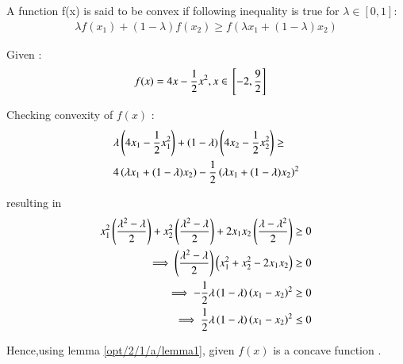 \begin{lemma}
A function f(x) is said to be convex if following inequality is true for $\lambda \in [0,1] :$  \label{opt/2/1/a/lemma1}
\begin{align}
    \lambda f(x_1) + (1-\lambda)f(x_2) \geq f(\lambda x_1 + (1-\lambda)x_2)
\end{align}
\end{lemma}

Given :
\begin{align}
    f(x) &= 4x-\frac{1}{2}x^2 , x \in {}\left[-2,\frac{9}{2}\right]
\end{align}

Checking convexity of $f(x)$ :
\begin{equation}
\begin{aligned}
    &\lambda\left(4x_1-\frac{1}{2}x_1^2\right) + (1-\lambda)\left(4x_2-\frac{1}{2}x_2^2\right) \geq \\
    &4\left(\lambda x_1 + (1-\lambda)x_2\right) - \frac{1}{2}\left(\lambda x_1 + (1-\lambda)x_2\right)^2
\end{aligned}
\end{equation}

resulting in
\begin{align}
    x_1^2\left(\frac{\lambda^2-\lambda}{2}\right)+x_2^2\left(\frac{\lambda^2-\lambda}{2}\right)+ 2x_1x_2\left(\frac{\lambda-\lambda^2}{2}\right) &\geq 0 \\
    \implies \left(\frac{\lambda^2-\lambda}{2}\right)\left(x_1^2+x_2^2-2x_1x_2\right) &\geq 0 \\
    \implies -\frac{1}{2}\lambda\left(1-\lambda\right)\left(x_1-x_2\right)^2 &\geq 0 \\
    \implies \frac{1}{2}\lambda\left(1-\lambda\right)\left(x_1-x_2\right)^2 &\leq 0
\end{align}

Hence,using lemma \ref{opt/2/1/a/lemma1}, given $f(x)$ is a concave function .

